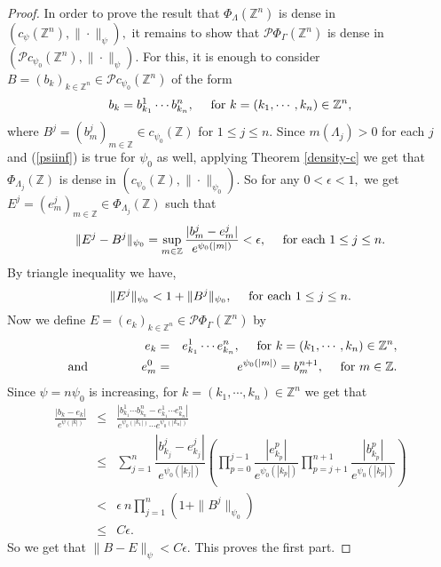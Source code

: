 \documentclass [11pt]{amsart}
\newcommand{\Z}{\mathbb Z}
\newcommand{\txt} {\textmd}
\newcommand{\beas} {\begin{eqnarray*}}
\newcommand{\eeas} {\end{eqnarray*}}
\numberwithin{equation}{section}
\begin{document}
\begin{proof}
In order to prove the result that $\Phi_\Lambda(\Z^n)$ is dense in $(c_\psi(\Z^n),\|\cdot\|_\psi),$ it remains to show that $\mathcal{P}\Phi_{\Gamma}(\Z^n)$ is dense in $(\mathcal{P}c_{\psi_0}(\Z^n),\|\cdot\|_\psi).$ For this, it is enough to consider $B = (b_k)_{k \in \Z^n} \in \mathcal{P}c_{\psi_0}(\Z^n)$ of the form $$b_k=b^1_{k_1}\cdots b^n_{k_n},\quad \txt{ for }  k=(k_1, \cdots , k_n)\in \Z^n,$$
where $ B^j=(b^j_m)_{m\in\Z}\in c_{\psi_0}(\Z)$ for $1\leq j \leq n.$ Since $m(\Lambda_j)>0$ for each $j$ and (\ref{psiinf}) is true for $\psi_0$ as well, applying Theorem \ref{density-c} we get that $\Phi_{\Lambda_j}(\Z)$ is dense in $(c_{\psi_0}(\Z), \|\cdot\|_{\psi_0}).$ So for any $0<\epsilon<1,$ we get $E^j=(e^j_m)_{m\in\Z}\in \Phi_{\Lambda_j}(\Z)$  such that
\begin{equation*}
\|E^j - B^j\|_{\psi_0} = \sup_{m \in \Z} \frac{|b^j_{m}- e^j_{m}|}{e^{\psi_0(|m|)}}<\epsilon, \quad \txt{ for each } 1\leq j\leq n. 
\end{equation*}
By triangle inequality we have,
$$ \|E^j\|_{\psi_0} < 1+\|B^j\|_{\psi_0}, \quad \txt{ for each } 1\leq j \leq n . $$ 
Now we define $E=(e_k)_{k \in \Z^n} \in \mathcal{P}\Phi_{\Gamma}(\Z^n)$ by
\beas e_k &=& e^1_{k_1}\cdots e^n_{k_n},\quad \txt{ for }  k=(k_1, \cdots , k_n)\in \Z^n, \\  
\txt{ and } \quad \quad \quad \quad  e^0_{m} &=& e^{\psi_0(|m|)}=b^{n+1}_{m},\quad \txt{ for } m \in \Z.\eeas Since $\psi = n \psi_0$ is increasing, for $k=(k_1,\cdots , k_n)\in \Z^n$ we get that
\begin{eqnarray*}
\frac{|b_k- e_k|}{e^{\psi(|k|)}} &\leq& \frac{|b^1_{k_1}\cdots b^n_{k_n}- e^1_{k_1}\cdots e^n_{k_n}|}{e^{\psi_0(|k_1|)}\cdots e^{\psi_0(|k_n|)}}\\
&\leq & \sum_{j=1}^n\dfrac{|b^j_{k_j}-e^j_{k_j}|}{e^{\psi_0(|k_j|)}}\left( \prod_{p=0}^{j-1}\dfrac{|e^p_{k_p}|}{e^{\psi_0(|k_p|)}} \prod_{p=j+1}^{n+1}\dfrac{|b^p_{k_p}|}{e^{\psi_0(|k_p|)}} \right) \\ 
&< & \epsilon ~ n \prod_{j=1}^n (1+\|B^j\|_{\psi_0}) \\ 
&\leq & C\epsilon.
\end{eqnarray*}
So we get that $\|B-E\|_\psi < C \epsilon.$ This proves the first part.


\end{proof}
\end{document}

